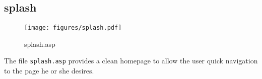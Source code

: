 \subsection{splash}
\begin{figure}[htb]
    \begin{center}
        \texttt{[image: figures/splash.pdf]}
    \end{center}
    \caption{splash.asp}
    \label{fig:splash}
\end{figure}

The file \verb|splash.asp| provides a clean homepage to allow the user quick
navigation to the page he or she desires.
